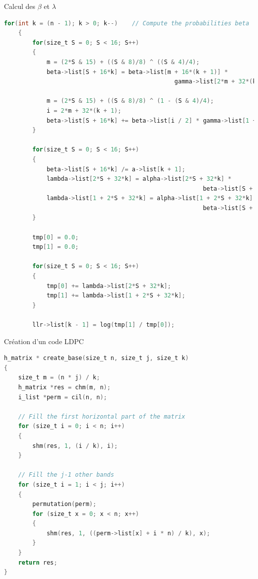 \documentclass[11pt]{beamer}
\begin{document}
\begin{frame}{Calcul des $\beta$ et $\lambda$}
	\begin{lstlisting}[language=C]
    for(int k = (n - 1); k > 0; k--)    // Compute the probabilities beta
    {
        for(size_t S = 0; S < 16; S++)
        {
            m = (2*S & 15) + ((S & 8)/8) ^ ((S & 4)/4);
            beta->list[S + 16*k] = beta->list[m + 16*(k + 1)] *
                                                gamma->list[2*m + 32*(k + 1)];

            m = (2*S & 15) + ((S & 8)/8) ^ (1 - (S & 4)/4);
            i = 2*m + 32*(k + 1);
            beta->list[S + 16*k] += beta->list[i / 2] * gamma->list[1 + i];
        }

        for(size_t S = 0; S < 16; S++)
        {
            beta->list[S + 16*k] /= a->list[k + 1];
            lambda->list[2*S + 32*k] = alpha->list[2*S + 32*k] *
                                                        beta->list[S + 16*k];
            lambda->list[1 + 2*S + 32*k] = alpha->list[1 + 2*S + 32*k] *
                                                        beta->list[S + 16*k];
        }

        tmp[0] = 0.0;
        tmp[1] = 0.0;

        for(size_t S = 0; S < 16; S++)
        {
            tmp[0] += lambda->list[2*S + 32*k];
            tmp[1] += lambda->list[1 + 2*S + 32*k];
        }

        llr->list[k - 1] = log(tmp[1] / tmp[0]);
	\end{lstlisting}
\end{frame}

\begin{frame}{Cr\'eation d'un code LDPC}
	\begin{lstlisting}[language=C]
h_matrix * create_base(size_t n, size_t j, size_t k)
{
    size_t m = (n * j) / k;
    h_matrix *res = chm(m, n);
    i_list *perm = cil(n, n);

    // Fill the first horizontal part of the matrix
    for (size_t i = 0; i < n; i++)
    {
        shm(res, 1, (i / k), i);
    }

    // Fill the j-1 other bands
    for (size_t i = 1; i < j; i++)
    {
        permutation(perm);
        for (size_t x = 0; x < n; x++)
        {
            shm(res, 1, ((perm->list[x] + i * n) / k), x);
        }
    }
    return res;
}
	\end{lstlisting}
\end{frame}
\end{document}
